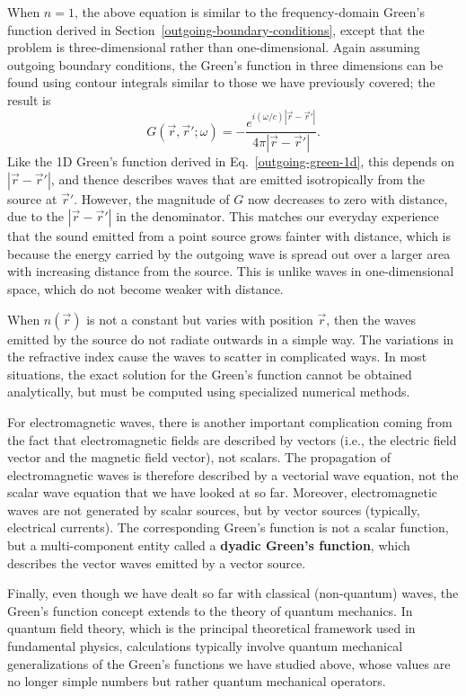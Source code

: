 \documentclass[10pt,a4paper]{article}
\begin{document}
When $n = 1$, the above equation is similar to the frequency-domain
Green's function derived in
Section~\ref{outgoing-boundary-conditions}, except that the problem is
three-dimensional rather than one-dimensional. Again assuming outgoing
boundary conditions, the Green's function in three dimensions can be
found using contour integrals similar to those we have previously
covered; the result is
\begin{equation}
G(\vec{r},\vec{r}';\omega) = -\frac{e^{i(\omega/c)|\vec{r}-\vec{r}'|}}{4\pi|\vec{r}-\vec{r}'|}.
\end{equation}
Like the 1D Green's function derived in Eq.~\eqref{outgoing-green-1d},
this depends on $|\vec{r}-\vec{r}'|$, and thence describes waves that
are emitted isotropically from the source at $\vec{r}'$. However, the
magnitude of $G$ now decreases to zero with distance, due to the
$|\vec{r}-\vec{r}'|$ in the denominator. This matches our everyday
experience that the sound emitted from a point source grows fainter
with distance, which is because the energy carried by the outgoing
wave is spread out over a larger area with increasing distance from
the source.  This is unlike waves in one-dimensional space, which do
not become weaker with distance.

When $n(\vec{r})$ is not a constant but varies with position
$\vec{r}$, then the waves emitted by the source do not radiate
outwards in a simple way. The variations in the refractive index cause
the waves to scatter in complicated ways. In most situations, the
exact solution for the Green's function cannot be obtained
analytically, but must be computed using specialized numerical
methods.

For electromagnetic waves, there is another important complication
coming from the fact that electromagnetic fields are described by
vectors (i.e., the electric field vector and the magnetic field vector),
not scalars. The propagation of electromagnetic waves is therefore
described by a vectorial wave equation, not the scalar wave equation
that we have looked at so far. Moreover, electromagnetic waves are not
generated by scalar sources, but by vector sources (typically,
electrical currents). The corresponding Green's function is not a scalar
function, but a multi-component entity called a \textbf{dyadic Green's
function}, which describes the vector waves emitted by a vector source.

Finally, even though we have dealt so far with classical (non-quantum)
waves, the Green's function concept extends to the theory of quantum
mechanics. In quantum field theory, which is the principal theoretical
framework used in fundamental physics, calculations typically involve
quantum mechanical generalizations of the Green's functions we have
studied above, whose values are no longer simple numbers but rather
quantum mechanical operators.
\end{document}
